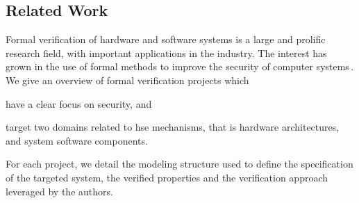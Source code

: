 %


\subsection{Related Work}
\label{subsec:sota:ltsrelated}

Formal verification of hardware and software systems is a large and prolific
research field, with important applications in the industry.
%
The interest has grown in the use of formal methods to improve the security of
computer systems\,\cite{chong2016report}.
%
We give an overview of formal verification projects which
%
\begin{inparaenum}[(1)]
\item have a clear focus on security, and
\item target two domains related to \ac{hse} mechanisms, that is hardware
  architectures, and system software components.
\end{inparaenum}
%
For each project, we detail the modeling structure used to define the
specification of the targeted system, the verified properties and the
verification approach leveraged by the authors.


